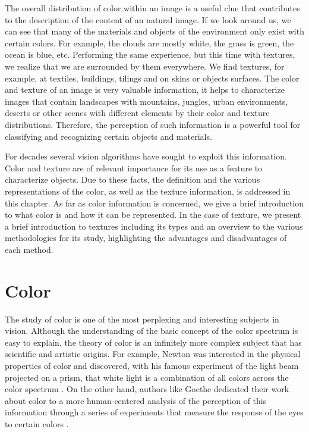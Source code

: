 The overall distribution of color within an image is a useful clue that contributes to the description of the content of an natural image. If we look around us, we can see that many of the materials and objects of the environment only exist with certain colors. For example, the clouds are mostly  white, the grass is green, the ocean is blue, etc. Performing the same experience, but this time with textures, we realize that we are surrounded by them everywhere. We find textures, for example, at textiles, buildings, tilings and on skins or objects surfaces. The color and texture of an image is very valuable information, it helps to characterize images that contain landscapes with mountains, jungles, urban environments, deserts or other scenes with different elements by their color and texture distributions. Therefore, the perception of such information is a powerful tool for classifying and recognizing certain objects and materials.

For decades several vision algorithms have sought to exploit this information. Color and texture are of relevant importance for its use as a feature to characterize objects. Due to these facts, the definition and the various representations of the color, as well as the texture information, is addressed in this chapter. As far as color information is concerned, we give a brief introduction to what color is and how it can be represented. In the case of texture, we present a brief introduction to textures including its types and an overview to the various methodologies for its study, highlighting the advantages and disadvantages of each method. 


\section{Color}
The study of color is one of the most perplexing and interesting subjects in vision. Although the understanding of the basic concept of the color spectrum is easy to explain, the theory of color is an infinitely more complex subject that has scientific and artistic origins. For example, Newton was interested in the physical properties of color and discovered, with his famous experiment of the light beam projected on a prism, that white light is a combination of all colors across the color spectrum \citep{Newton:Book:1704}.  On the other hand, authors like Goethe dedicated their work about color to a more human-centered analysis of the perception of this information through a series of experiments that measure the response of the eyes to certain colors \citep{Goethe:Book:2015}.

